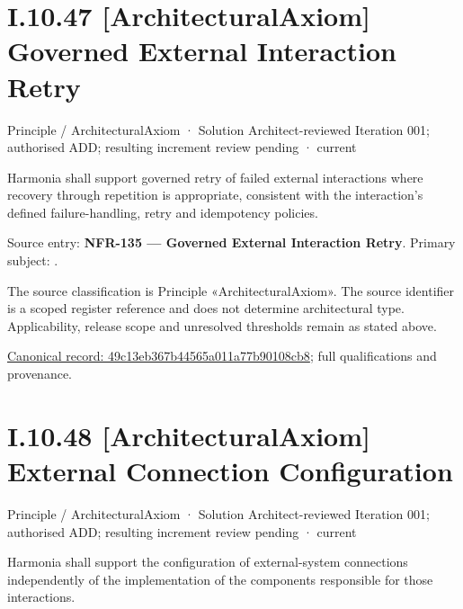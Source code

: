 \section*{I.10.47 [ArchitecturalAxiom] Governed External Interaction Retry}
\label{navigation:I.10.47}

\label{element:49c13eb367b44565a011a77b90108cb8}
{\small Principle / ArchitecturalAxiom · Solution Architect-reviewed Iteration 001; authorised ADD; resulting increment review pending · current}\par

Harmonia shall support governed retry of failed external interactions where recovery through repetition is appropriate, consistent with the interaction's defined failure-handling, retry and idempotency policies.



Source entry: \textbf{NFR-135 — Governed External Interaction Retry}. Primary subject: \texttt{}.



The source classification is Principle «ArchitecturalAxiom». The source identifier is a scoped register reference and does not determine architectural type. Applicability, release scope and unresolved thresholds remain as stated above.


{\footnotesize \href{../../../../../../../../continuum/motivation/principle/architectural-axiom/49c13eb367b44565a011a77b90108cb8.md}{Canonical record: 49c13eb367b44565a011a77b90108cb8}; full qualifications and provenance.}\par
\section*{I.10.48 [ArchitecturalAxiom] External Connection Configuration}
\label{navigation:I.10.48}

\label{element:f24e63c49135411bbfbc06f9385aeea5}
{\small Principle / ArchitecturalAxiom · Solution Architect-reviewed Iteration 001; authorised ADD; resulting increment review pending · current}\par

Harmonia shall support the configuration of external-system connections independently of the implementation of the components responsible for those interactions.



